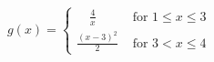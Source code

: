 \documentclass[preview]{standalone}
\begin{document}
\begin{align*}
g(x) = \begin{cases}
                \quad \frac{4}{x} &\text{ for } 1 \leq x \leq 3 \\
                \frac{(x-3)^2}{2} &\text{ for } 3 < x \leq 4
            \end{cases}
\end{align*}
\end{document}
